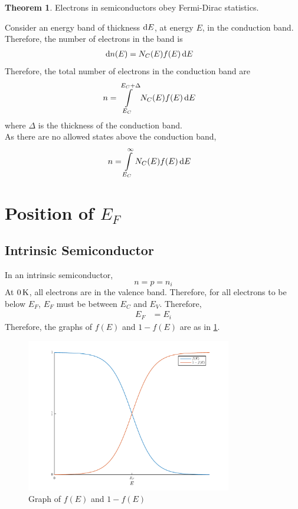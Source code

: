 \documentclass[titlepage, fleqn, a4paper, 12pt, twoside]{article}
\theoremstyle{definition}
\theoremstyle{theorem}
\newtheorem{theorem}{Theorem}
\begin{document}
\begin{theorem}
	Electrons in semiconductors obey Fermi-Dirac statistics.
\end{theorem}

Consider an energy band of thickness $\dif E$, at energy $E$, in the conduction band.
Therefore, the number of electrons in the band is
\begin{align*}
	\dif n(E) & = N_C(E) f(E) \dif E
\end{align*}
Therefore, the total number of electrons in the conduction band are
\begin{align*}
	n & = \int\limits_{E_C}^{E_{C} + \Delta} N_C(E) f(E) \dif E
\end{align*}
where $\Delta$ is the thickness of the conduction band.\\
As there are no allowed states above the conduction band,
\begin{align*}
	n & = \int\limits_{E_C}^{\infty} N_C(E) f(E) \dif E
\end{align*}

\section{Position of $E_F$}

\subsection{Intrinsic Semiconductor}

In an intrinsic semiconductor,
\begin{equation*}
	n = p = n_i
\end{equation*}
At $0 \kelvin$, all electrons are in the valence band.
Therefore, for all electrons to be below $E_F$, $E_F$ must be between $E_C$ and $E_V$.
Therefore,
\begin{align*}
	E_F & = E_i
\end{align*}
Therefore, the graphs of $f(E)$ and $1 - f(E)$ are as in \cref{fig:Graph_of_$f(E)$_and_$1_-_f(E)$}.
\begin{figure}[h]
	\centering
	\includegraphics[width = 0.8\textwidth]{./Plots/fermi_function_and_one_minus_fermi_function.pdf}
	\caption{Graph of $f(E)$ and $1 - f(E)$}
	\label{fig:Graph_of_$f(E)$_and_$1_-_f(E)$}
\end{figure}
\end{document}
